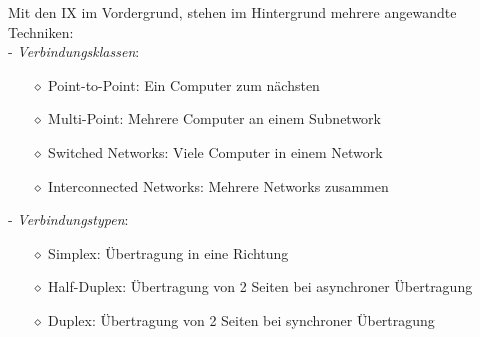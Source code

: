 \documentclass[11pt]{article}
\begin{document}
    Mit den IX im Vordergrund, stehen im Hintergrund mehrere angewandte Techniken:\\
    - \emph{Verbindungsklassen}:
    \begin{enumerate}
        \item[$\diamond$] Point-to-Point: Ein Computer zum nächsten
        \item[$\diamond$] Multi-Point: Mehrere Computer an einem Subnetwork
        \item[$\diamond$] Switched Networks: Viele Computer in einem Network
        \item[$\diamond$] Interconnected Networks: Mehrere Networks zusammen
    \end{enumerate}
    - \emph{Verbindungstypen}:
    \begin{enumerate}
        \item[$\diamond$] Simplex: Übertragung in eine Richtung
        \item[$\diamond$] Half-Duplex: Übertragung von 2 Seiten bei asynchroner Übertragung
        \item[$\diamond$] Duplex: Übertragung von 2 Seiten bei synchroner Übertragung
    \end{enumerate}
\end{document}
